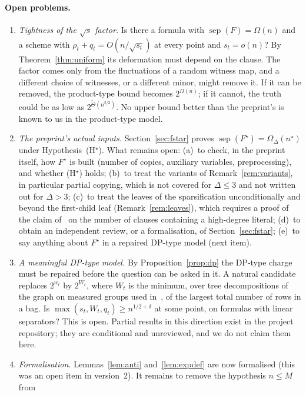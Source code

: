 \documentclass[11pt,a4paper]{article}
\theoremstyle{definition}
\theoremstyle{remark}
\newcommand{\sep}{\operatorname{sep}}
\begin{document}
\paragraph{Open problems.}
\begin{enumerate}
\item \emph{Tightness of the $\sqrt s$ factor.} Is there a formula with
 $\sep(F)=\Omega(n)$ and a scheme with $\rho_t+q_t=O(n/\sqrt{s_t})$ at every point and
 $s_t=o(n)$? By Theorem~\ref{thm:uniform} its deformation must depend on the clause. The
 factor comes only from the fluctuations of a random witness map, and a different choice of
 witnesses, or a different minor, might remove it. If it can be removed, the product-type
 bound becomes $2^{\Omega(n)}$; if it cannot, the truth could be as low as
 $2^{\tilde\Theta(n^{2/3})}$.
 No upper bound better than the preprint's is known to us in the product-type model.
\item \emph{The preprint's actual inputs.} Section~\ref{sec:fstar} proves
 $\sep(F^\star)=\Omega_\Delta(n^\star)$ under Hypothesis~(H$^\star$). What remains open:
 (a)~to check, in the preprint itself, how $F^\star$ is built (number of copies, auxiliary
 variables, preprocessing), and whether (H$^\star$) holds; (b)~to treat the variants of
 Remark~\ref{rem:variants}, in particular partial copying, which is not covered for
 $\Delta\le3$ and not written out for $\Delta>3$; (c)~to treat the leaves of the
 sparsification unconditionally and beyond the first-child leaf
 (Remark~\ref{rem:leaves}), which requires a proof of the claim of~\cite{DL} on the number
 of clauses containing a high-degree literal; (d)~to obtain an independent review, or a
 formalisation, of Section~\ref{sec:fstar}; (e)~to say anything about $F^\star$ in a
 repaired DP-type model (next item).
\item \emph{A meaningful DP-type model.} By Proposition~\ref{prop:dp} the DP-type charge
 must be repaired before the question can be asked in it. A natural candidate replaces
 $2^{w_t}$ by $2^{W_t}$, where $W_t$ is the minimum, over tree decompositions of the graph
 on measured groups used in~\cite{DL}, of the largest total number of rows in a bag. Is
 $\max(s_t,W_t,q_t)\ge n^{1/2+\delta}$ at some point, on formulas with linear separators?
 This is open. Partial results in this direction exist in the project repository; they are
 conditional and unreviewed, and we do not claim them here.
\item \emph{Formalisation.} Lemmas~\ref{lem:anti} and~\ref{lem:expdef} are now formalised
 (this was an open item in version~2). It remains to remove the hypothesis $n\le M$ from

\end{enumerate}
\end{document}
